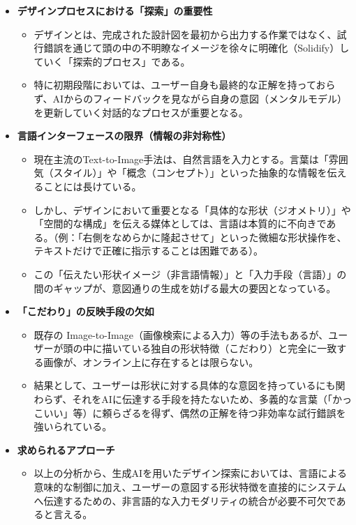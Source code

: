 \documentclass[dvipdfmx]{jlreq}
\begin{document}
\begin{itemize}
  \item \textbf{デザインプロセスにおける「探索」の重要性}
  \begin{itemize}
    \item デザインとは、完成された設計図を最初から出力する作業ではなく、試行錯誤を通じて頭の中の不明瞭なイメージを徐々に明確化（Solidify）していく「探索的プロセス」である。
    \item 特に初期段階においては、ユーザー自身も最終的な正解を持っておらず、AIからのフィードバックを見ながら自身の意図（メンタルモデル）を更新していく対話的なプロセスが重要となる。
  \end{itemize}

  \item \textbf{言語インターフェースの限界（情報の非対称性）}
  \begin{itemize}
    \item 現在主流のText-to-Image手法は、自然言語を入力とする。言葉は「雰囲気（スタイル）」や「概念（コンセプト）」といった抽象的な情報を伝えることには長けている。
    \item しかし、デザインにおいて重要となる「具体的な形状（ジオメトリ）」や「空間的な構成」を伝える媒体としては、言語は本質的に不向きである。（例：「右側をなめらかに隆起させて」といった微細な形状操作を、テキストだけで正確に指示することは困難である）。
    \item この「伝えたい形状イメージ（非言語情報）」と「入力手段（言語）」の間のギャップが、意図通りの生成を妨げる最大の要因となっている。
  \end{itemize}

  \item \textbf{「こだわり」の反映手段の欠如}
  \begin{itemize}
    \item 既存の Image-to-Image（画像検索による入力）等の手法もあるが、ユーザーが頭の中に描いている独自の形状特徴（こだわり）と完全に一致する画像が、オンライン上に存在するとは限らない。
    \item 結果として、ユーザーは形状に対する具体的な意図を持っているにも関わらず、それをAIに伝達する手段を持たないため、多義的な言葉（「かっこいい」等）に頼らざるを得ず、偶然の正解を待つ非効率な試行錯誤を強いられている。
  \end{itemize}

  \item \textbf{求められるアプローチ}
  \begin{itemize}
    \item 以上の分析から、生成AIを用いたデザイン探索においては、言語による意味的な制御に加え、ユーザーの意図する形状特徴を直接的にシステムへ伝達するための、非言語的な入力モダリティの統合が必要不可欠であると言える。
  \end{itemize}
\end{itemize}
\end{document}
